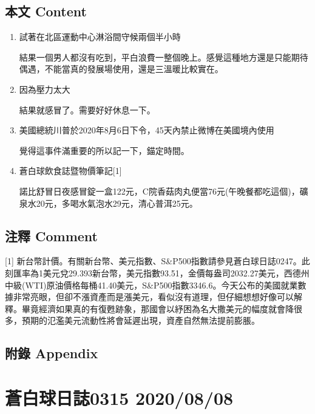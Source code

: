 \documentclass[
]{article}
\begin{document}
\hypertarget{ux672cux6587-content-6}{%
\subsection{本文 Content}\label{ux672cux6587-content-6}}

\begin{enumerate}
\def\labelenumi{\arabic{enumi}.}
\item
  試著在北區運動中心淋浴間守候兩個半小時

  結果一個男人都沒有吃到，平白浪費一整個晚上。感覺這種地方還是只能期待偶遇，不能當真的發展場使用，還是三溫暖比較實在。
\item
  因為壓力太大

  結果就感冒了。需要好好休息一下。
\item
  美國總統川普於2020年8月6日下令，45天內禁止微博在美國境內使用

  覺得這事件滿重要的所以記一下，錨定時間。
\item
  蒼白球飲食誌暨物價筆記{[}1{]}

  諾比舒冒日夜感冒錠一盒122元，C院香菇肉丸便當76元(午晚餐都吃這個)，礦泉水20元，多喝水氣泡水29元，清心普洱25元。
\end{enumerate}

\hypertarget{ux6ce8ux91cb-comment-6}{%
\subsection{注釋 Comment}\label{ux6ce8ux91cb-comment-6}}

{[}1{]}
新台幣計價。有關新台幣、美元指數、S\&P500指數請參見蒼白球日誌0247。此刻匯率為1美元兌29.393新台幣，美元指數93.51，金價每盎司2032.27美元，西德州中級(WTI)原油價格每桶41.40美元，S\&P500指數3346.6。今天公布的美國就業數據非常亮眼，但卻不漲資產而是漲美元，看似沒有道理，但仔細想想好像可以解釋。畢竟經濟如果真的有復甦跡象，那國會以紓困為名大撒美元的幅度就會降很多，預期的氾濫美元流動性將會延遲出現，資產自然無法提前膨脹。

\hypertarget{ux9644ux9304-appendix-6}{%
\subsection{附錄 Appendix}\label{ux9644ux9304-appendix-6}}

\hypertarget{ux84bcux767dux7403ux65e5ux8a8c0315-20200808}{%
\section{蒼白球日誌0315
2020/08/08}\label{ux84bcux767dux7403ux65e5ux8a8c0315-20200808}}
\end{document}
